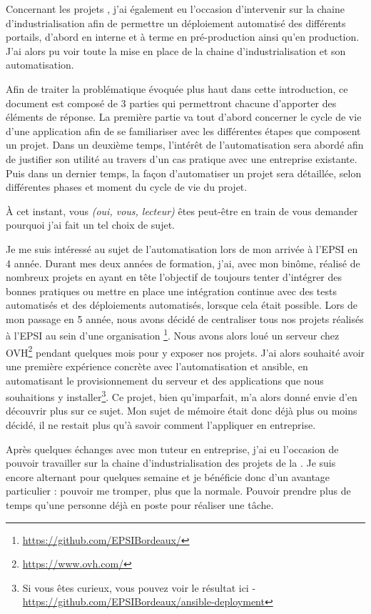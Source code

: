 Concernant les projets \naq, j'ai également eu l'occasion d'intervenir sur la chaine d'industrialisation afin de permettre un déploiement automatisé des différents portails, d'abord en interne et à terme en pré-production ainsi qu'en production. J'ai alors pu voir toute la mise en place de la chaine d'industrialisation et son automatisation.

Afin de traiter la problématique évoquée plus haut dans cette introduction, ce document est composé de 3 parties qui permettront chacune d'apporter des éléments de réponse. La première partie va tout d'abord concerner le cycle de vie d'une application afin de se familiariser avec les différentes étapes que composent un projet. Dans un deuxième temps, l'intérêt de l'automatisation sera abordé afin de justifier son utilité au travers d'un cas pratique avec une entreprise existante. Puis dans un dernier temps, la façon d'automatiser un projet sera détaillée, selon différentes phases et moment du cycle de vie du projet.

À cet instant, vous \emph{(oui, vous, lecteur)} êtes peut-être en train de vous demander pourquoi j'ai fait un tel choix de sujet. 

Je me suis intéressé au sujet de l'automatisation lors de mon arrivée à l'EPSI en 4 année. Durant mes deux années de formation, j'ai, avec mon binôme, réalisé de nombreux projets en ayant en tête l'objectif de toujours tenter d'intégrer des bonnes pratiques ou mettre en place une intégration continue avec des tests automatisés et des déploiements automatisés, lorsque cela était possible. Lors de mon passage en 5 année, nous avons décidé de centraliser tous nos projets réalisés à l'EPSI au sein d'une organisation \github\footnote{\url{https://github.com/EPSIBordeaux/}}. Nous avons alors loué un serveur chez OVH\footnote{\url{https://www.ovh.com/}} pendant quelques mois pour y exposer nos projets. J'ai alors souhaité avoir une première expérience concrète avec l'automatisation et ansible, en automatisant le provisionnement du serveur et des applications que nous souhaitions y installer\footnote{Si vous êtes curieux, vous pouvez voir le résultat ici - \url{https://github.com/EPSIBordeaux/ansible-deployment}}. Ce projet, bien qu'imparfait, m'a alors donné envie d'en découvrir plus sur ce sujet. Mon sujet de mémoire était donc déjà plus ou moins décidé, il ne restait plus qu'à savoir comment l'appliquer en entreprise.

Après quelques échanges avec mon tuteur en entreprise, j'ai eu l'occasion de pouvoir travailler sur la chaine d'industrialisation des projets de la \naq. Je suis encore alternant pour quelques semaine et je bénéficie donc d'un avantage particulier : pouvoir me tromper, plus que la normale. Pouvoir prendre plus de temps qu'une personne déjà en poste pour réaliser une tâche.


